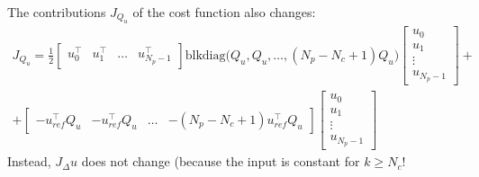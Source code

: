 \documentclass[a4paper,12pt,fleqn]{book}
\newcommand{\Np}{{N_p}}
\newcommand{\Nc}{{N_c}}
\newcommand{\blkdiag}{\text{blkdiag}}
\begin{document}
The contributions $J_{Q_u}$ of the cost function also changes:
\begin{multline}
\label{eq:J_Qu_Nc}
 J_{Q_u} = \frac{1}{2}
 \begin{bmatrix}
  u_0^\top & u_1^\top &\dots & u_{\Np-1}^\top
 \end{bmatrix}
 \blkdiag\bigg(Q_u, Q_u, \dots, (\Np - \Nc + 1)Q_u\bigg)
 \begin{bmatrix}
  u_0 \\  u_1\\ \vdots\\  u_{\Np-1}
 \end{bmatrix}
  + \\
 +
  \begin{bmatrix}
  -u_{ref}^\top Q_u & -u_{ref}^\top Q_u &\dots & -(\Np - \Nc + 1)u_{ref}^\top Q_u
 \end{bmatrix}
 \begin{bmatrix}
  u_0 \\ u_1 \\ \vdots \\ u_{\Np-1}
 \end{bmatrix}
 \end{multline}
Instead, $J_\Delta u$ does not change (because the input is constant for $k \geq N_c$!
\end{document}
